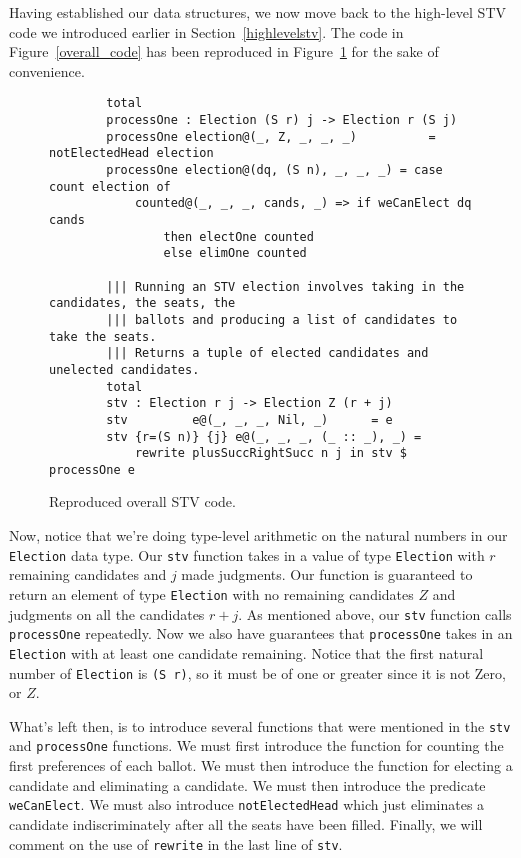 Having established our data structures, we now move back to the high-level STV
code we introduced earlier in Section~\ref{highlevelstv}. The code in
Figure~\ref{overall_code} has been reproduced in Figure~\ref{overall_code2} for
the sake of convenience.

\begin{figure}[ht!!!!!!!!]
	\caption{Reproduced overall STV code.}
	\label{overall_code2}
	\begin{lstlisting}
        total
        processOne : Election (S r) j -> Election r (S j)
        processOne election@(_, Z, _, _, _)          = notElectedHead election
        processOne election@(dq, (S n), _, _, _) = case count election of
            counted@(_, _, _, cands, _) => if weCanElect dq cands
                then electOne counted
                else elimOne counted

        ||| Running an STV election involves taking in the candidates, the seats, the
        ||| ballots and producing a list of candidates to take the seats. 
        ||| Returns a tuple of elected candidates and unelected candidates.
        total
        stv : Election r j -> Election Z (r + j)
        stv         e@(_, _, _, Nil, _)      = e
        stv {r=(S n)} {j} e@(_, _, _, (_ :: _), _) = 
            rewrite plusSuccRightSucc n j in stv $ processOne e
    \end{lstlisting}
\end{figure}

Now, notice that we're doing type-level arithmetic on the natural numbers in our
\texttt{Election} data type. Our \texttt{stv} function takes in a value of type
\texttt{Election} with $r$ remaining candidates and $j$ made judgments. Our
function is guaranteed to return an element of type \texttt{Election} with no
remaining candidates $Z$ and judgments on all the candidates $r+j$. As mentioned
above, our \texttt{stv} function calls \texttt{processOne} repeatedly. Now we
also have guarantees that \texttt{processOne} takes in an \texttt{Election} with
at least one candidate remaining. Notice that the first natural number of
\texttt{Election} is \texttt{(S r)}, so it must be of one or greater since it is
not Zero, or $Z$. 

What's left then, is to introduce several functions that were mentioned in the
\texttt{stv} and \texttt{processOne} functions. We must first introduce the
function for counting the first preferences of each ballot. We must then
introduce the function for electing a candidate and eliminating a candidate. We
must then introduce the predicate \texttt{weCanElect}. We must also introduce
\texttt{notElectedHead} which just eliminates a candidate indiscriminately after
all the seats have been filled. Finally, we will comment on the use of
\texttt{rewrite} in the last line of \texttt{stv}. 

